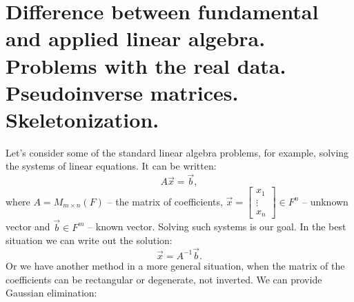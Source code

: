 \section{Difference between fundamental and applied linear algebra. Problems with the real data. Pseudoinverse matrices. Skeletonization.}
    \par 
    Let's consider some of the standard linear algebra problems, for example, solving the systems of linear equations. It can be written:
    \[
        A\vec{x} = \vec{b},    
    \]
    where $A = M_{m \times n}(F)$ -- the matrix of coefficients, $\vec{x} = \begin{bmatrix}
        x_1 \\
        \vdots \\
        x_n
    \end{bmatrix} \in F^n$ -- unknown vector and $\vec{b} \in F^m$ -- known vector. Solving such systems is our goal. In the best situation we can write out the solution:
    \[
        \vec{x} = A^{-1}\vec{b}.
    \]
    Or we have another method in a more general situation, when the matrix of the coefficients can be rectangular or degenerate, not inverted. We can provide Gaussian elimination:
